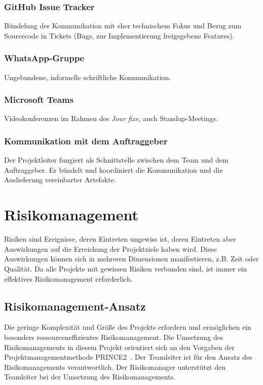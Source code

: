 \documentclass[a4paper,11pt,listof=numbered,glossary=totoc,parskip=half]{scrreprt}
\begin{document}
\subsection{GitHub Issue Tracker}

Bündelung der Kommunikation mit eher technischem Fokus und Bezug zum Sourcecode in Tickets (Bugs, zur Implementierung freigegebene Features).

\subsection{WhatsApp-Gruppe}

Ungebundene, informelle schriftliche Kommunikation.

\subsection{Microsoft Teams}

Videokonferenzen im Rahmen des \textit{Jour fixe}, auch Standup-Meetings.

\subsection{Kommunikation mit dem Auftraggeber}

Der Projektleiter fungiert als Schnittstelle zwischen dem Team und dem Auftraggeber. Er bündelt und koordiniert die Kommunikation und die Auslieferung vereinbarter Artefakte.

	\newpage
	\chapter{Risikomanagement}

Risiken sind Ereignisse, deren Eintreten ungewiss ist, deren Eintreten aber Auswirkungen auf die Erreichung der Projektziele haben wird. Diese Auswirkungen können sich in mehreren Dimensionen manifestieren, z.B. Zeit oder Qualität. Da alle Projekte mit gewissen Risiken verbunden sind, ist immer ein effektives Risikomanagement erforderlich. 

\section{Risikomanagement-Ansatz}

Die geringe Komplexität und Größe des Projekts erfordern und ermöglichen ein besonders ressourceneffizientes Risikomanagement. Die Umsetzung des Risikomanagements in diesem Projekt orientiert sich an den Vorgaben der Projektmanagementmethode PRINCE2\textregistered\ \autocite{Prince2}.
Der Teamleiter ist für den Ansatz des Risikomanagements verantwortlich. Der Risikomanager unterstützt den Teamleiter bei der Umsetzung des Risikomanagements.
\end{document}
